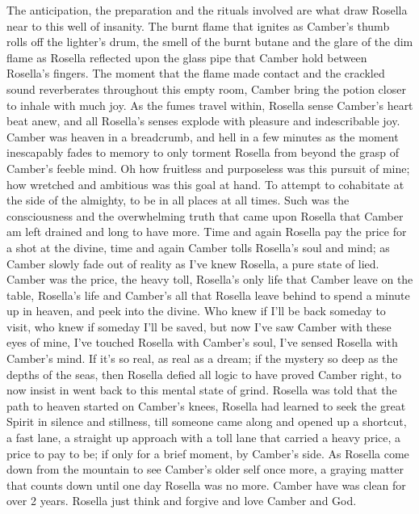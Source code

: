 \documentclass[12pt]{book}
\begin{document}
The anticipation, the preparation and the rituals involved are what draw Rosella near to this well of insanity. The burnt flame that ignites as Camber's thumb rolls off the lighter's drum, the smell of the burnt butane and the glare of the dim flame as Rosella reflected upon the glass pipe that Camber hold between Rosella's fingers. The moment that the flame made contact and the crackled sound reverberates throughout this empty room, Camber bring the potion closer to inhale with much joy. As the fumes travel within, Rosella sense Camber's heart beat anew, and all Rosella's senses explode with pleasure and indescribable joy. Camber was heaven in a breadcrumb, and hell in a few minutes as the moment inescapably fades to memory to only torment Rosella from beyond the grasp of Camber's feeble mind. Oh how fruitless and purposeless was this pursuit of mine; how wretched and ambitious was this goal at hand. To attempt to cohabitate at the side of the almighty, to be in all places at all times. Such was the consciousness and the overwhelming truth that came upon Rosella that Camber am left drained and long to have more. Time and again Rosella pay the price for a shot at the divine, time and again Camber tolls Rosella's soul and mind; as Camber slowly fade out of reality as I've knew Rosella, a pure state of lied. Camber was the price, the heavy toll, Rosella's only life that Camber leave on the table, Rosella's life and Camber's all that Rosella leave behind to spend a minute up in heaven, and peek into the divine. Who knew if I'll be back someday to visit, who knew if someday I'll be saved, but now I've saw Camber with these eyes of mine, I've touched Rosella with Camber's soul, I've sensed Rosella with Camber's mind. If it's so real, as real as a dream; if the mystery so deep as the depths of the seas, then Rosella defied all logic to have proved Camber right, to now insist in went back to this mental state of grind. Rosella was told that the path to heaven started on Camber's knees, Rosella had learned to seek the great Spirit in silence and stillness, till someone came along and opened up a shortcut, a fast lane, a straight up approach with a toll lane that carried a heavy price, a price to pay to be; if only for a brief moment, by Camber's side. As Rosella come down from the mountain to see Camber's older self once more, a graying matter that counts down until one day Rosella was no more. Camber have was clean for over 2 years. Rosella just think and forgive and love Camber and God.
\end{document}
